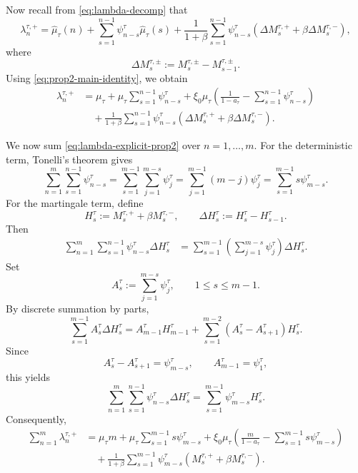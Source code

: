\documentclass[letterpaper]{article}
\numberwithin{equation}{section}
\theoremstyle{definition}
\theoremstyle{remark}
\begin{document}
Now recall from \eqref{eq:lambda-decomp} that
\[
  \lambda_n^{\tau,+}
  =
  \hat\mu_\tau(n)
  +
  \sum_{s=1}^{n-1}\psi_{n-s}^\tau\hat\mu_\tau(s)
  +
  \frac1{1+\beta}\sum_{s=1}^{n-1}\psi_{n-s}^\tau
  \left(
    \Delta M_s^{\tau,+}
    +
    \beta \Delta M_s^{\tau,-}
  \right),
\]
where
\[
  \Delta M_s^{\tau,\pm}:=M_s^{\tau,\pm}-M_{s-1}^{\tau,\pm}.
\]
Using \eqref{eq:prop2-main-identity}, we obtain
\begin{align}
  \lambda_n^{\tau,+}
  &=
  \mu_\tau
  +
  \mu_\tau\sum_{s=1}^{n-1}\psi_{n-s}^\tau
  +
  \xi_0\mu_\tau
  \left(
    \frac1{1-a_\tau}
    -
    \sum_{s=1}^{n-1}\psi_{n-s}^\tau
  \right)
  \nonumber\\
  &\quad
  +
  \frac1{1+\beta}\sum_{s=1}^{n-1}\psi_{n-s}^\tau
  \left(
    \Delta M_s^{\tau,+}
    +
    \beta \Delta M_s^{\tau,-}
  \right).
  \label{eq:lambda-explicit-prop2}
\end{align}

We now sum \eqref{eq:lambda-explicit-prop2} over $n=1,\dots,m$.
For the deterministic term, Tonelli's theorem gives
\[
  \sum_{n=1}^{m}\sum_{s=1}^{n-1}\psi_{n-s}^\tau
  =
  \sum_{s=1}^{m-1}\sum_{j=1}^{m-s}\psi_j^\tau
  =
  \sum_{j=1}^{m-1}(m-j)\psi_j^\tau
  =
  \sum_{s=1}^{m-1}s\psi_{m-s}^\tau.
\]
For the martingale term, define
\[
  H_s^\tau:=M_s^{\tau,+}+\beta M_s^{\tau,-},
  \qquad
  \Delta H_s^\tau:=H_s^\tau-H_{s-1}^\tau.
\]
Then
\begin{align*}
  \sum_{n=1}^{m}\sum_{s=1}^{n-1}\psi_{n-s}^\tau \Delta H_s^\tau
  &=
  \sum_{s=1}^{m-1}\left(\sum_{j=1}^{m-s}\psi_j^\tau\right)\Delta H_s^\tau.
\end{align*}
Set
\[
  A_s^\tau:=\sum_{j=1}^{m-s}\psi_j^\tau,
  \qquad 1\le s\le m-1.
\]
By discrete summation by parts,
\[
  \sum_{s=1}^{m-1}A_s^\tau \Delta H_s^\tau
  =
  A_{m-1}^\tau H_{m-1}^\tau
  +
  \sum_{s=1}^{m-2}(A_s^\tau-A_{s+1}^\tau)H_s^\tau.
\]
Since
\[
  A_s^\tau-A_{s+1}^\tau=\psi_{m-s}^\tau,
  \qquad
  A_{m-1}^\tau=\psi_1^\tau,
\]
this yields
\[
  \sum_{n=1}^{m}\sum_{s=1}^{n-1}\psi_{n-s}^\tau \Delta H_s^\tau
  =
  \sum_{s=1}^{m-1}\psi_{m-s}^\tau H_s^\tau.
\]
Consequently,
\begin{align}
  \sum_{n=1}^{m}\lambda_n^{\tau,+}
  &=
  \mu_\tau m
  +
  \mu_\tau\sum_{s=1}^{m-1}s\psi_{m-s}^\tau
  +
  \xi_0\mu_\tau
  \left(
    \frac{m}{1-a_\tau}
    -
    \sum_{s=1}^{m-1}s\psi_{m-s}^\tau
  \right)
  \nonumber\\
  &\quad
  +
  \frac1{1+\beta}
  \sum_{s=1}^{m-1}\psi_{m-s}^\tau
  \left(
    M_s^{\tau,+}+\beta M_s^{\tau,-}
  \right).
  \label{eq:sum-lambda-prop2}
\end{align}
\end{document}
